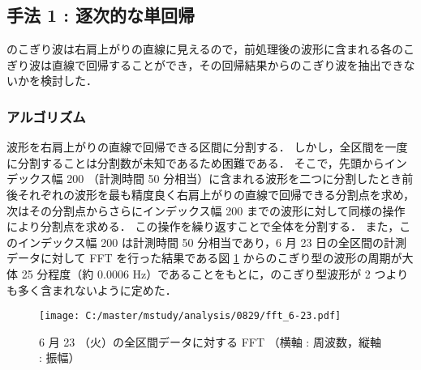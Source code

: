 \documentclass[a4j]{jarticle}
\begin{document}
\subsection{手法 1 : 逐次的な単回帰}
のこぎり波は右肩上がりの直線に見えるので，前処理後の波形に含まれる各のこぎり波は直線で回帰することができ，その回帰結果からのこぎり波を抽出できないかを検討した．

\subsubsection{アルゴリズム}
波形を右肩上がりの直線で回帰できる区間に分割する．
しかし，全区間を一度に分割することは分割数が未知であるため困難である．
そこで，先頭からインデックス幅 200 （計測時間 50 分相当）に含まれる波形を二つに分割したとき前後それぞれの波形を最も精度良く右肩上がりの直線で回帰できる分割点を求め，次はその分割点からさらにインデックス幅 200 までの波形に対して同様の操作により分割点を求める．
この操作を繰り返すことで全体を分割する．
また，このインデックス幅 200 は計測時間 50 分相当であり，6 月 23 日の全区間の計測データに対して FFT を行った結果である図 \ref{fft} からのこぎり型の波形の周期が大体 25 分程度（約 0.0006 Hz）であることをもとに，のこぎり型波形が 2 つよりも多く含まれないように定めた．
\begin{figure}[tb]
\begin{center}
\texttt{[image: C:/master/mstudy/analysis/0829/fft\_6-23.pdf]}
\caption{6 月 23 （火）の全区間データに対する FFT （横軸 : 周波数，縦軸 : 振幅）}
\label{fft}
\end{center}
\end{figure}
\end{document}
